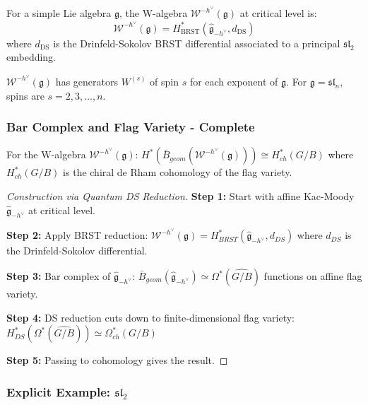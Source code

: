\begin{definition}
For a simple Lie algebra $\mathfrak{g}$, the W-algebra $\mathcal{W}^{-h^\vee}(\mathfrak{g})$ at critical 
level is:
\[
\mathcal{W}^{-h^\vee}(\mathfrak{g}) = H^*_{\text{BRST}}(\widehat{\mathfrak{g}}_{-h^\vee}, d_{\text{DS}})
\]
where $d_{\text{DS}}$ is the Drinfeld-Sokolov BRST differential associated to a principal $\mathfrak{sl}_2$ 
embedding.
\end{definition}
 
\begin{remark}[Generators]
$\mathcal{W}^{-h^\vee}(\mathfrak{g})$ has generators $W^{(s)}$ of spin $s$ for each exponent of $\mathfrak{g}$. 
For $\mathfrak{g} = \mathfrak{sl}_n$, spins are $s = 2, 3, \ldots, n$.
\end{remark}
 
\subsubsection{Bar Complex and Flag Variety - Complete}

\begin{theorem}
For the W-algebra $\mathcal{W}^{-h^\vee}(\mathfrak{g})$:
$H^*(\bar{B}_{geom}(\mathcal{W}^{-h^\vee}(\mathfrak{g}))) \cong H^*_{ch}(G/B)$
where $H^*_{ch}(G/B)$ is the chiral de Rham cohomology of the flag variety.
\end{theorem}

\begin{proof}[Construction via Quantum DS Reduction]
\textbf{Step 1:} Start with affine Kac-Moody $\hat{\mathfrak{g}}_{-h^\vee}$ at critical level.

\textbf{Step 2:} Apply BRST reduction:
$\mathcal{W}^{-h^\vee}(\mathfrak{g}) = H^*_{BRST}(\hat{\mathfrak{g}}_{-h^\vee}, d_{DS})$
where $d_{DS}$ is the Drinfeld-Sokolov differential.

\textbf{Step 3:} Bar complex of $\hat{\mathfrak{g}}_{-h^\vee}$:
$\bar{B}_{geom}(\hat{\mathfrak{g}}_{-h^\vee}) \simeq \Omega^*(\widehat{G/B})$
functions on affine flag variety.

\textbf{Step 4:} DS reduction cuts down to finite-dimensional flag variety:
$H^*_{DS}(\Omega^*(\widehat{G/B})) \simeq \Omega^*_{ch}(G/B)$

\textbf{Step 5:} Passing to cohomology gives the result.
\end{proof}
 
\subsubsection{Explicit Example: $\mathfrak{sl}_2$}
 
